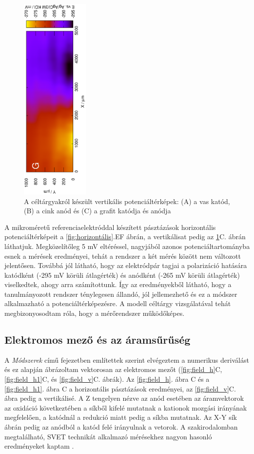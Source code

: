 \begin{figure}
\includegraphics[width=0.3\textwidth, angle=-90]{img/mérések/grafit_v.eps}
\caption{A céltárgyakról készült vertikális potenciáltérképek:
(A) a vas katód, (B) a cink anód és (C) a grafit katódja és anódja}
\label{fig:vertikális}
\end{figure}

A mikroméretű referenciaelektróddal készített pásztázások horizontális potenciáltérképeit a \ref{fig:horizontális}.EF ábrán, a vertikálisat pedig az \ref{fig:vertikális}C. ábrán láthatjuk. Megközelítőleg 5 mV eltéréssel, nagyjából azonos potenciáltartományba esnek a mérések eredményei, tehát a rendszer a két mérés között nem változott jelentősen. Továbbá jól látható, hogy az elektródpár tagjai a polarizáció hatására katódként (-295 mV körüli átlagérték) és anódként (-265 mV körüli átlagérték) viselkedtek, ahogy arra számítottunk. Így az eredményekből látható, hogy a tanulmányozott rendszer ténylegesen állandó, jól jellemezhető és ez a módszer alkalmazható a potenciáltérképezésre. A modell céltárgy vizsgálatával tehát megbizonyosodtam róla, hogy a mérőrendszer működőképes.

\subsection{Elektromos mező és az áramsűrűség}
A \emph{Módszerek} című fejezetben említettek szerint elvégeztem a numerikus deriválást és ez alapján ábrázoltam vektorosan az elektromos mezőt (\ref{fig:field_h}C,  \ref{fig:field_h1}C, és \ref{fig:field_v}C. ábrák). Az \ref{fig:field_h}. ábra C és a \ref{fig:field_h1}. ábra C a horizontális pásztázások eredményei, az \ref{fig:field_v}C. ábra pedig a vertikálisé. A Z tengelyen nézve az anód esetében az áramvektorok az oxidáció következtében a síkből kifelé mutatnak a kationok mozgási irányának megfelelően, a katódnál a redukció miatt pedig a síkba mutatnak. Az X-Y sík ábrán pedig az anódból a katód felé irányulnak a vetorok. A szakirodalomban megtalálható, SVET technikát alkalmazó mérésekhez nagyon hasonló eredményeket kaptam \cite{bastos2016preliminary}. 

